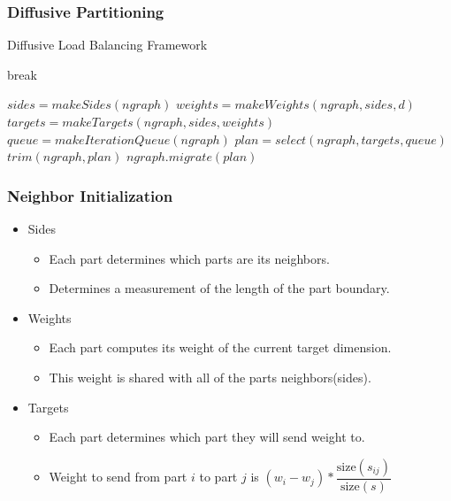 \documentclass{beamer}
\begin{document}
\begin{frame}
  \frametitle{Diffusive Partitioning}
  \begin{algorithm}[H]
    \caption{Diffusive Load Balancing Framework}
    \label{alg:engpar}
    \small
    \begin{algorithmic}[1]
      \State break
      \EndIf
      \EndWhile
      \EndFor
      \EndProcedure

      \State $sides = makeSides(ngraph)$
      \State $weights = makeWeights(ngraph,sides,d)$
      \State $targets = makeTargets(ngraph,sides,weights)$
      \State $queue = makeIterationQueue(ngraph)$
      \State $plan = select(ngraph,targets,queue)$
      \State $trim(ngraph,plan)$
      \State $ngraph.migrate(plan)$
      \EndProcedure
    \end{algorithmic}
  \end{algorithm}
\end{frame}

\begin{frame}
  \frametitle{Neighbor Initialization}
  \begin{itemize}
  \item Sides
    \begin{itemize}
    \item Each part determines which parts are its neighbors.
    \item Determines a measurement of the length of the part boundary.
    \end{itemize}
  \item Weights
    \begin{itemize}
    \item Each part computes its weight of the current target dimension.
    \item This weight is shared with all of the parts neighbors(sides).
    \end{itemize}
  \item Targets
    \begin{itemize}
    \item Each part determines which part they will send weight to.
    \item Weight to send from part $i$ to part $j$ is $(w_i-w_j)*\dfrac{\text{size}(s_{ij})}{\text{size}(s)}$
    \end{itemize}
  \end{itemize}
\end{frame}
\end{document}
